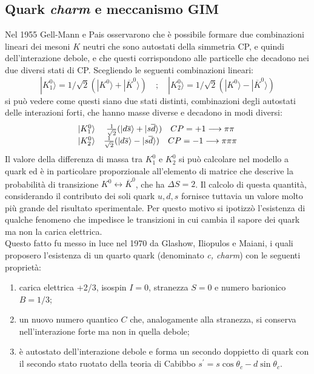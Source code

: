 \documentclass{subnucbo}
\begin{document}
\subsection{Quark \textit{charm} e meccanismo GIM}
Nel 1955 Gell-Mann e Pais osservarono che è possibile formare due combinazioni lineari dei mesoni $K$ neutri che sono autostati della simmetria CP, e quindi dell'interazione debole, e che questi corrispondono alle particelle che decadono nei due diversi stati di CP. Scegliendo le seguenti combinazioni lineari:
\begin{equation}
        | K _ { 1 } ^ { 0 } \rangle = 1 / \sqrt { 2 } ( | K ^ { 0 } \rangle + | \overline { K } ^ { 0 } \rangle ) \quad ; \quad | K _ { 2 } ^ { 0 } \rangle = 1 / \sqrt { 2 } ( | K ^ { 0 } \rangle - | \overline { K } ^ { 0 } \rangle )
\end{equation}
si può vedere come questi siano due stati distinti, combinazioni degli autostati delle interazioni forti, che hanno masse diverse e decadono in modi diversi:
\begin{equation}
        \begin{array} { c c } { | K _ { 1 } ^ { 0 } \rangle } & { \frac { 1 } { \sqrt { 2 } } ( | d \overline { s } \rangle + | s \overline { d } \rangle ) \quad C P = + 1 \longrightarrow \pi \pi } \\ { | K _ { 2 } ^ { 0 } \rangle } & { \frac { 1 } { \sqrt { 2 } } ( | d \overline { s } \rangle - | s \overline { d } \rangle ) \quad C P = - 1 \longrightarrow \pi \pi \pi } \end{array}
\end{equation}
Il valore della differenza di massa tra $K^{0}_{1}$ e $K^{0}_{2}$ si può calcolare nel modello a quark ed è in particolare proporzionale all'elemento di matrice che descrive la probabilità di transizione $K ^ { 0 } \leftrightarrow \overline { K } ^ { 0 }$, che ha $\Delta S = 2$. Il calcolo di questa quantità, considerando il contributo dei soli quark $u, d, s$ fornisce tuttavia un valore molto più grande del risultato sperimentale. Per questo motivo si ipotizzò l'esistenza di qualche fenomeno che impedisce le transizioni in cui cambia il sapore dei quark ma non la carica elettrica. \\
Questo fatto fu messo in luce nel 1970 da Glashow, Iliopulos e Maiani, i quali proposero l'esistenza di un quarto quark (denominato \textit{c, charm}) con le seguenti proprietà:
\begin{enumerate}
        \item carica elettrica +2/3, isospin $I=0$, stranezza $S=0$ e numero barionico $B=1/3$;
        \item un nuovo numero quantico $C$ che, analogamente alla stranezza, si conserva nell'interazione forte ma non in quella debole;
        \item è autostato dell'interazione debole e forma un secondo doppietto di quark con il secondo stato ruotato della teoria di Cabibbo $s ^ { \prime } = s \operatorname { c o s } \theta _ { c } - d \operatorname { s i n } \theta _ { c }$.
\end{enumerate}
\end{document}
